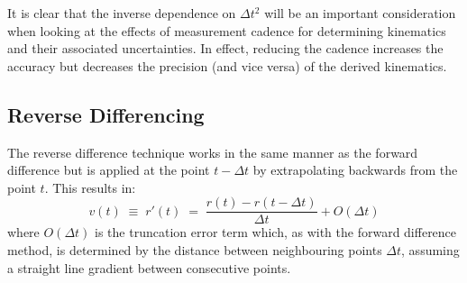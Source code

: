 \documentclass[namedreferences]{SolarPhysics}
\begin{document}
\begin{article}
It is clear that the inverse dependence on $\Delta t^2$ will be an important consideration when looking at the effects of measurement cadence for determining kinematics and their associated uncertainties. In effect, reducing the cadence increases the accuracy but decreases the precision (and vice versa) of the derived kinematics.


\subsection{Reverse Differencing}
\label{sect_reverse}

The reverse difference technique works in the same manner as the forward difference but is applied at the point $t - \Delta t$ by extrapolating backwards from the point $t$. This results in:
\begin{equation}
v(t) \; \equiv \; r'(t) \; = \; \frac{r(t ) - r(t - \Delta t)}{\Delta t} + O(\Delta t)
\end{equation}
where $O(\Delta t)$ is the truncation error term which, as with the forward difference method, is determined by the distance between neighbouring points $\Delta t$, assuming a straight line gradient between consecutive points.





\end{article}
\end{document}
